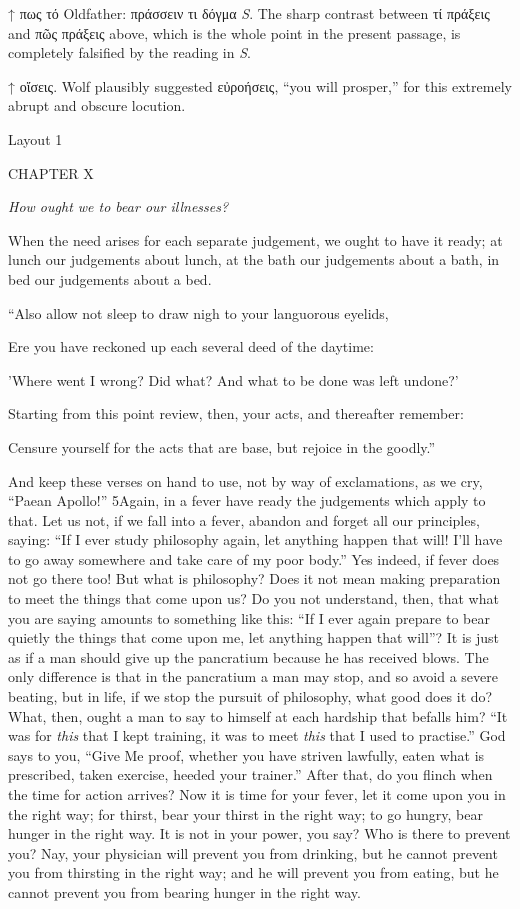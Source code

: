 

↑ πως τό Oldfather: πράσσειν τι δόγμα \emph{S}. The sharp contrast between τί πράξεις and πῶς πράξεις above, which is the whole point in the present passage, is completely falsified by the reading in \emph{S}.

↑ οἴσεις. Wolf plausibly suggested εὐροήσεις, ``you will prosper,'' for this extremely abrupt and obscure locution.


Layout 1

CHAPTER X

\emph{How ought we to bear our illnesses?}

When the need arises for each separate judgement, we ought to have it ready; at lunch our judgements about lunch, at the bath our judgements about a bath, in bed our judgements about a bed.

``Also allow not sleep to draw nigh to your languorous eyelids,

Ere you have reckoned up each several deed of the daytime:

'Where went I wrong? Did what? And what to be done was left undone?'

Starting from this point review, then, your acts, and thereafter remember:

Censure yourself for the acts that are base, but rejoice in the goodly.''

And keep these verses on hand to use, not by way of exclamations, as we cry, ``Paean Apollo!'' 5Again, in a fever have ready the judgements which apply to that. Let us not, if we fall into a fever, abandon and forget all our principles, saying: ``If I ever study philosophy again, let anything happen that will! I'll have to go away somewhere and take care of my poor body.'' Yes indeed, if fever does not go there too! But what is philosophy? Does it not mean making preparation to meet the things that come upon us? Do you not understand, then, that what you are saying amounts to something like this: ``If I ever again prepare to bear quietly the things that come upon me, let anything happen that will''? It is just as if a man should give up the pancratium because he has received blows. The only difference is that in the pancratium a man may stop, and so avoid a severe beating, but in life, if we stop the pursuit of philosophy, what good does it do? What, then, ought a man to say to himself at each hardship that befalls him? ``It was for \emph{this} that I kept training, it was to meet \emph{this} that I used to practise.'' God says to you, ``Give Me proof, whether you have striven lawfully, eaten what is prescribed, taken exercise, heeded your trainer.'' After that, do you flinch when the time for action arrives? Now it is time for your fever, let it come upon you in the right way; for thirst, bear your thirst in the right way; to go hungry, bear hunger in the right way. It is not in your power, you say? Who is there to prevent you? Nay, your physician will prevent you from drinking, but he cannot prevent you from thirsting in the right way; and he will prevent you from eating, but he cannot prevent you from bearing hunger in the right way.

